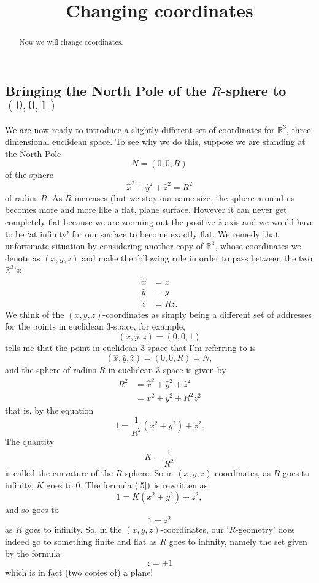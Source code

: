 \documentclass{ximera}
\title{Changing coordinates}
\begin{document}
\begin{abstract}
Now we will change coordinates.
\end{abstract}
\maketitle


\subsection*{Bringing the North Pole of the $R$-sphere to $\left(
0,0,1\right)  $}

We are now ready to introduce a slightly different set of coordinates for
$\mathbb{R}^{3}$, three-dimensional euclidean space. To see why we do this,
suppose we are standing at the North Pole%
\[
N=\left(  0,0,R\right)
\]
of the sphere%
\begin{equation}
\hat{x}^{2}+\hat{y}^{2}+\hat{z}^{2}=R^{2} \label{4}%
\end{equation}
of radius $R$. As $R$ increases (but we stay our same size, the sphere around
us becomes more and more like a flat, plane surface. However it can never get
completely flat because we are zooming out the positive $\hat{z}$-axis and we
would have to be `at infinity' for our surface to become exactly flat. We
remedy that unfortunate situation by considering another copy of
$\mathbb{R}^{3}$, whose coordinates we denote as $\left(  x,y,z\right)  $ and
make the following rule in order to pass between the two $\mathbb{R}^{3}$'s:%
\begin{align}
\hat{x}  &  =x\label{105}\\
\hat{y}  &  =y\nonumber\\
\hat{z}  &  =Rz.\nonumber
\end{align}
We think of the $\left(  x,y,z\right)  $-coordinates as simply being a
different set of addresses for the points in euclidean $3$-space, for example,%
\[
\left(  x,y,z\right)  =\left(  0,0,1\right)
\]
tells me that the point in euclidean $3$-space that I'm referring to is%
\[
\left(  \hat{x},\hat{y},\hat{z}\right)  =\left(  0,0,R\right)  =N,
\]
and the sphere of radius $R$ in euclidean $3$-space is given by%
\begin{align*}
R^{2}  &  =\hat{x}^{2}+\hat{y}^{2}+\hat{z}^{2}\\
&  =x^{2}+y^{2}+R^{2}z^{2}%
\end{align*}
that is, by the equation%
\begin{equation}
1=\frac{1}{R^{2}}\left(  x^{2}+y^{2}\right)  +z^{2}. \label{5}%
\end{equation}
The quantity%
\[
K=\frac{1}{R^{2}}%
\]
is called the curvature of the $R$-sphere. So in $\left(  x,y,z\right)
$-coordinates, as $R$ goes to infinity, $K$ goes to $0$. The formula $\left(
\ref{5}\right)  $ is rewritten as%
\begin{equation}
1=K\left(  x^{2}+y^{2}\right)  +z^{2}, \label{7}%
\end{equation}
and so goes to%
\[
1=z^{2}%
\]
as $R$ goes to infinity. So, in the $\left(  x,y,z\right)  $-coordinates, our
`$R$-geometry' does indeed go to something finite and flat as $R$ goes to
infinity, namely the set given by the formula%
\[
z=\pm1
\]
which is in fact (two copies of) a plane!
\end{document}

